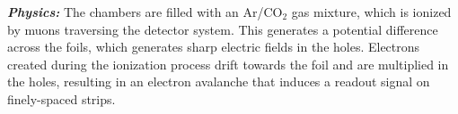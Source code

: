 \textbf{\textit{Physics:}}
The chambers are filled with an Ar/CO$_2$ gas mixture, which is ionized by muons traversing the detector system.
This generates a potential difference across the foils, which generates sharp electric fields in the holes.
Electrons created during the ionization process drift towards the foil and are multiplied in the holes, resulting in an electron avalanche that induces a readout signal on finely-spaced strips.








